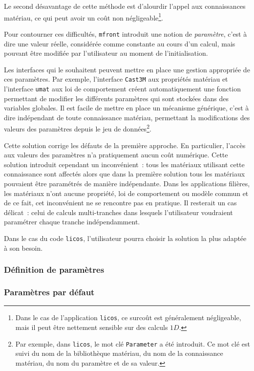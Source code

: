 \documentclass[rectoverso,pleiades,pstricks,leqno,anti]{texmf/note_technique_2010}
\newcommand{\mfront}{\texttt{mfront}}
\newcommand{\licos}{\texttt{licos}}
\newcommand{\castem}{\texttt{Cast3M}}
\newcommand{\umat}{\texttt{umat}}
\begin{document}
Le second désavantage de cette méthode est d'alourdir l'appel aux
connaissances matériau, ce qui peut avoir un coût non
négligeable\footnote{Dans le cas de l'application \licos{}, ce surcoût
  est généralement négligeable, mais il peut être nettement sensible sur
  des calculs \(1D\).}.

Pour contourner ces difficultés, \mfront{} introduit une notion de
{\em paramètre}, c'est à dire une valeur réelle, considérée comme
constante au cours d'un calcul, mais pouvant être modifiée par
l'utilisateur au moment de l'initialisation.

Les interfaces qui le souhaitent peuvent mettre en place une gestion
appropriée de ces paramètres. Par exemple, l'interface \castem{} aux
propriétés matériau et l'interface \umat{} aux loi de comportement
créent automatiquement une fonction permettant de modifier les
différents paramètres qui sont stockées dans des variables globales. Il
est facile de mettre en place un mécanisme générique, c'est à dire
indépendant de toute connaissance matériau, permettant la modifications
des valeurs des paramètres depuis le jeu de données\footnote{Par
  exemple, dans \licos{}, le mot clé {\tt Parameter} a été introduit. Ce
  mot clé est suivi du nom de la bibliothèque matériau, du nom de la
  connaissance matériau, du nom du paramètre et de sa valeur.}.

Cette solution corrige les défauts de la première approche. En
particulier, l'accès aux valeurs des paramètres n'a pratiquement aucun
coût numérique. Cette solution introduit cependant un inconvénient~:
tous les matériaux utilisant cette connaissance sont affectés alors que
dans la première solution tous les matériaux pouvaient être paramétrés
de manière indépendante. Dans les applications filières, les matériaux
n'ont aucune propriété, loi de comportement ou modèle commun et de ce
fait, cet inconvénient ne se rencontre pas en pratique. Il resterait un
cas délicat~: celui de calculs multi-tranches dans lesquels
l'utilisateur voudraient paramétrer chaque tranche indépendamment.

Dans le cas du code \licos{}, l'utilisateur pourra choisir la
solution la plus adaptée à son besoin.

\subsubsection{Définition de paramètres}

\subsubsection{Paramètres par défaut}
\end{document}

